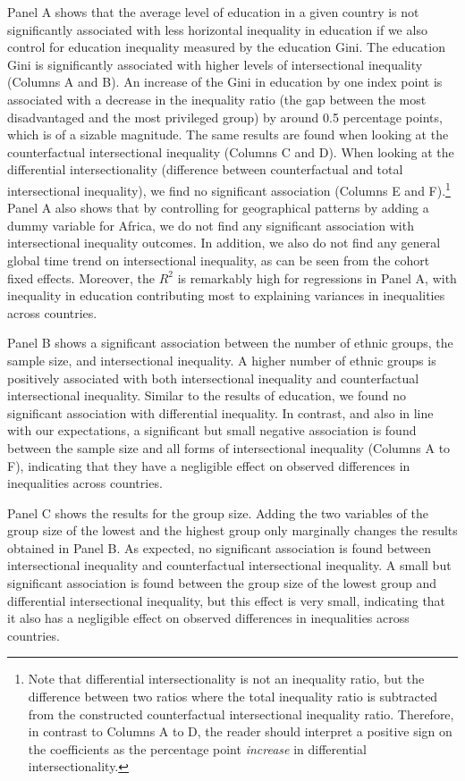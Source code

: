 Panel A shows that the average level of education in a given country is not significantly associated with less horizontal inequality in education if we also control for education inequality measured by the education Gini. The education Gini is significantly associated with higher levels of intersectional inequality (Columns A and B). An increase of the Gini in education by one index point is associated with a decrease in the inequality ratio (the gap between the most disadvantaged and the most privileged group) by around 0.5 percentage points, which is of a sizable magnitude. The same results are found when looking at the counterfactual intersectional inequality (Columns C and D). When looking at the differential intersectionality (difference between counterfactual and total intersectional inequality), we find no significant association (Columns E and F).\footnote{Note that differential intersectionality is not an inequality ratio, but the difference between two ratios where the total inequality ratio is subtracted from the constructed counterfactual intersectional inequality ratio. Therefore, in contrast to Columns A to D, the reader should interpret a positive sign on the coefficients as the percentage point \textit{increase} in differential intersectionality.} Panel A also shows that by controlling for geographical patterns by adding a dummy variable for Africa, we do not find any significant association with intersectional inequality outcomes. In addition, we also do not find any general global time trend on intersectional inequality, as can be seen from the cohort fixed effects. Moreover, the $R^2$ is remarkably high for regressions in Panel A, with inequality in education contributing most to explaining variances in inequalities across countries. 

Panel B shows a significant association between the number of ethnic groups, the sample size, and intersectional inequality. A higher number of ethnic groups is positively associated with both intersectional inequality and counterfactual intersectional inequality. Similar to the results of education, we found no significant association with differential inequality. In contrast, and also in line with our expectations, a significant but small negative association is found between the sample size and all forms of intersectional inequality (Columns A to F), indicating that they have a negligible effect on observed differences in inequalities across countries.

Panel C shows the results for the group size. Adding the two variables of the group size of the lowest and the highest group only marginally changes the results obtained in Panel B. As expected, no significant association is found between intersectional inequality and counterfactual intersectional inequality. A small but significant association is found between the group size of the lowest group and differential intersectional inequality, but this effect is very small, indicating that it also has a negligible effect on observed differences in inequalities across countries. 

